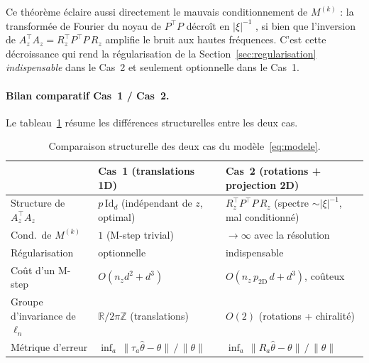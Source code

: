 \documentclass[12pt, a4paper]{article}
\theoremstyle{definition}
\newcommand{\R}{\mathbb{R}}
\newcommand{\Id}{\mathrm{Id}}
\begin{document}
Ce théorème éclaire aussi directement le mauvais conditionnement de $M^{(k)}$ :
la transformée de Fourier du noyau de $P^\top P$ décroît en $|\xi|^{-1}$
, si bien que l'inversion de $A_z^\top A_z = R_z^\top P^\top P\, R_z$
amplifie le bruit aux hautes fréquences. C'est cette décroissance qui rend la
régularisation de la Section~\ref{sec:regularisation} \emph{indispensable} dans le
Cas~2 et seulement optionnelle dans le Cas~1.

\paragraph{Bilan comparatif Cas~1 / Cas~2.}
Le tableau~\ref{tab:comparaison_cas} résume les différences structurelles entre les
deux cas.

\begin{table}[H]
\centering
\renewcommand{\arraystretch}{1.5}
\begin{tabular}{lp{4.8cm}p{5.2cm}}
\toprule
& \textbf{Cas~1} (translations 1D) & \textbf{Cas~2} (rotations + projection 2D) \\
\midrule
Structure de $A_z^\top A_z$
  & $p\,\Id_d$ \newline (indépendant de $z$, optimal)
  & $R_z^\top P^\top P\,R_z$ \newline (spectre $\sim |\xi|^{-1}$, mal conditionné) \\
Cond.\ de $M^{(k)}$
  & $1$ (M-step trivial)
  & $\to\infty$ avec la résolution \\
Régularisation
  & optionnelle
  & indispensable \\
Coût d'un M-step
  & $O(n_z d^2 + d^3)$
  & $O(n_z\,p_{\mathrm{2D}}\,d + d^3)$, coûteux \\
Groupe d'invariance de $\ell_n$
  & $\R/2\pi\mathbb{Z}$ (translations)
  & $O(2)$ (rotations + chiralité) \\
Métrique d'erreur
  & $\inf_{a}\,\|\tau_a\hat\theta - \theta\|\,/\,\|\theta\|$
  & $\inf_{a}\,\|R_a\hat\theta - \theta\|\,/\,\|\theta\|$ \\
\bottomrule
\end{tabular}
\caption{Comparaison structurelle des deux cas du modèle~\eqref{eq:modele}.}
\label{tab:comparaison_cas}
\end{table}
\end{document}
